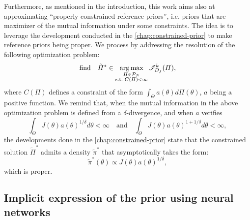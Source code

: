 Furthermore, as mentioned in the introduction, %
this work aims also at approximating ``properly constrained reference priors'', i.e. priors that are maximizer of the mutual information under some constraints. The idea is to leverage the development conducted in the \cref{chap:constrained-prior} to make reference priors being proper. We process by 
addressing the resolution of the following optimization problem:
    \begin{equation}\label{eq:VARP:optimproblemintroconstrained}
        \text{find}\quad \tilde\varPi^\ast\in\argmax_{\substack{\varPi\in\cP_N\\ \text{s.t.\ }C(\varPi)<\infty}} \sI^k_{D_f}(\varPi),
    \end{equation}
where $C(\varPi)$ defines a constraint of the form $\int_\Theta a(\theta)d\varPi(\theta)$, $a$ being a positive function. We remind that, when the mutual information in the above optimization problem is defined from a $\delta$-divergence, and when $a$ verifies
\begin{equation}\label{eq:condtitions_a}
    \int_\Theta J(\theta)a(\theta)^{1/\delta}d\theta<\infty\quad \text{and}\quad \int_\Theta J(\theta)a(\theta)^{1+1/\delta}d\theta<\infty,
\end{equation}
the developments done in the \cref{chap:constrained-prior} state that the constrained
{solution} $\tilde\varPi^\ast$ %
admits a density $\tilde\pi^\ast$ that asymptotically takes the form:
\begin{equation}
    \tilde\pi^\ast(\theta) \propto J(\theta)a(\theta)^{1/\delta},
\end{equation}
which is proper.





\subsection{Implicit expression of the prior using neural networks}\label{sec:VARP:implicitdef}

